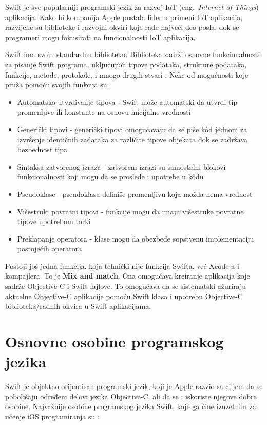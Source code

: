 \documentclass[a4paper]{article}
\begin{document}
Swift je sve popularniji programski jezik za razvoj IoT (eng.~{\em Internet of Things}) aplikacija. Kako bi kompanija Apple postala lider u primeni IoT aplikacija, razvijene su biblioteke i razvojni okviri koje rade najveći deo posla, dok se programeri mogu fokusirati na funcionalnosti IoT aplikacija.

Swift ima svoju standardnu biblioteku. Biblioteka sadrži osnovne funkcionalnosti za pisanje Swift programa, uključujući tipove podataka, strukture podataka, funkcije, metode, protokole, i mnogo drugih stvari \cite{naucni_rad}.
Neke od mogućnosti koje pruža pomoću svojih funkcija su: \cite{mastering_swift3}

\begin{itemize}
\item Automatsko utvrđivanje tipova - Swift može automatski da utvrdi tip promenljive ili konstante na osnovu inicijalne
vrednosti
\item Generički tipovi - generički tipovi omogućavaju da se piše k\^{o}d jednom za izvršenje identičnih zadataka za različite tipove objekata dok se zadržava bezbednost tipa
\item Sintaksa zatvorenog izraza - zatvoreni izrazi su samostalni blokovi funkcionalnosti koji mogu da se proslede i upotrebe u k\^{o}du
\item Pseudoklase - pseudoklasa definiše promenljivu koja možda nema vrednost
\item Višestruki povratni tipovi - funkcije mogu da imaju višestruke povratne tipove upotrebom torki
\item Preklapanje operatora - klase mogu da obezbede sopstvenu implementaciju postojećih operatora
\end{itemize}

Postoji još jedna funkcija, koja tehnički nije
funkcija Swifta, već Xcode-a i kompajlera. To je \textbf{Mix and match}. Ona omogućava kreiranje aplikacija koje sadrže Objective-C i Swift fajlove. To omogućava da se sistematski ažuriraju aktuelne Objective-C aplikacije pomoću Swift klasa i upotrebu Objective-C biblioteka/radnih okvira u Swift aplikacijama.

\section{Osnovne osobine programskog jezika}	
\label{sec:cetvrtiDeo}
Swift je objektno orijentisan programski jezik, koji je Apple razvio sa ciljem da se poboljšaju određeni delovi jezika Objective-C, ali da se i iskoriste njegove dobre osobine. Najvažnije osobine programskog jezika Swift, koje ga čine izuzetnim za učenje iOS programiranja su \cite{swift_programming}:
\end{document}
